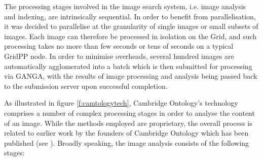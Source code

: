 \documentclass[10pt]{article}
\begin{document}
The processing stages involved in the image search system, i.e. image analysis and indexing, are intrinsically sequential. In order to benefit from parallelisation, it was decided to parallelise at the granularity of single images or small subsets of images. Each image can therefore be processed in isolation on the Grid, and such processing takes no more than few seconds or tens of seconds on a typical GridPP node. In order to minimise overheads, several hundred images are automatically agglomerated into a batch which is then submitted for processing via GANGA, with the results of image processing and analysis being passed back to the submission server upon successful completion.

As illustrated in figure \ref{f:camtologytech}, Cambridge Ontology's technology comprises a number of complex processing stages in order to analyse the content of an image. While the methods employed are proprietary, the overall process is related to earlier work by the founders of Cambridge Ontology which has been published (see \cite{Town2004, TownPhD}). Broadly speaking, the image analysis consists of the following stages:
\end{document}
